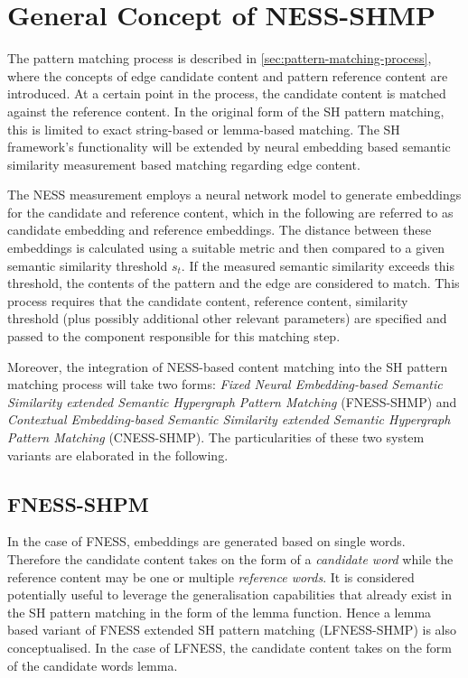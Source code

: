 \documentclass[11pt]{scrreprt}
\begin{document}
\section{General Concept of NESS-SHMP}
The pattern matching process is described in \cref{sec:pattern-matching-process}, where the concepts of edge candidate content and pattern reference content are introduced. At a certain point in the process, the candidate content is matched against the reference content. In the original form of the SH pattern matching, this is limited to exact string-based or lemma-based matching. The SH framework's functionality will be extended by neural embedding based semantic similarity measurement based matching regarding edge content.

The NESS measurement employs a neural network model to generate embeddings for the candidate and reference content, which in the following are referred to as candidate embedding and reference embeddings. The distance between these embeddings is calculated using a suitable metric and then compared to a given semantic similarity threshold \(s_t\). If the measured semantic similarity exceeds this threshold, the contents of the pattern and the edge are considered to match. This process requires that the candidate content, reference content, similarity threshold (plus possibly additional other relevant parameters) are specified and passed to the component responsible for this matching step.

Moreover, the integration of NESS-based content matching into the SH pattern matching process will take two forms: \textit{Fixed Neural Embedding-based Semantic Similarity extended Semantic Hypergraph Pattern Matching} (FNESS-SHMP) and  \textit{Contextual Embedding-based Semantic Similarity extended Semantic Hypergraph Pattern Matching} (CNESS-SHMP). The particularities of these two system variants are elaborated in the following.

\subsection{FNESS-SHPM}
In the case of FNESS, embeddings are generated based on single words. Therefore the candidate content takes on the form of a \textit{candidate word} while the reference content may be one or multiple \textit{reference words}. It is considered potentially useful to leverage the generalisation capabilities that already exist in the SH pattern matching in the form of the lemma function. Hence a lemma based variant of FNESS extended SH pattern matching (LFNESS-SHMP) is also conceptualised. In the case of LFNESS, the candidate content takes on the form of the candidate words lemma.
\end{document}
